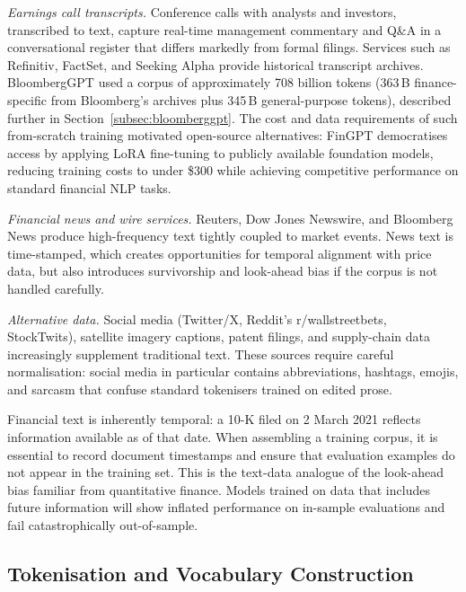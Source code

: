 \begin{context}
\emph{Earnings call transcripts.}  Conference calls with analysts and investors,
transcribed to text, capture real-time management commentary and Q\&A in a
conversational register that differs markedly from formal filings.  Services
such as Refinitiv, FactSet, and Seeking Alpha provide historical transcript
archives.  BloombergGPT \cite{wu2023bloomberggpt} used a corpus of approximately
708 billion tokens (363\,B finance-specific from Bloomberg's archives plus
345\,B general-purpose tokens), described further in
Section~\ref{subsec:bloomberggpt}.  The cost and data requirements
of such from-scratch training motivated open-source alternatives: FinGPT
\cite{yang2023fingpt_lora} democratises access by applying LoRA fine-tuning
to publicly available foundation models, reducing training costs to under
\$300 while achieving competitive performance on standard financial NLP tasks.

\emph{Financial news and wire services.}  Reuters, Dow Jones Newswire, and
Bloomberg News produce high-frequency text tightly coupled to market events.
News text is time-stamped, which creates opportunities for temporal alignment
with price data, but also introduces survivorship and look-ahead bias if the
corpus is not handled carefully.

\emph{Alternative data.}  Social media (Twitter/X, Reddit's r/wallstreetbets,
StockTwits), satellite imagery captions, patent filings, and supply-chain
data increasingly supplement traditional text.  These sources require careful
normalisation: social media in particular contains abbreviations, hashtags,
emojis, and sarcasm that confuse standard tokenisers trained on edited prose.

\begin{remark}
\label{rem:temporal-alignment}
Financial text is inherently temporal: a 10-K filed on 2 March 2021 reflects
information available as of that date.  When assembling a training corpus,
it is essential to record document timestamps and ensure that evaluation
examples do not appear in the training set.  This is the text-data analogue of
the look-ahead bias familiar from quantitative finance.  Models trained on
data that includes future information will show inflated performance on
in-sample evaluations and fail catastrophically out-of-sample.
\end{remark}

\subsection{Tokenisation and Vocabulary Construction}
\label{subsec:tokenisation}


\end{context}
